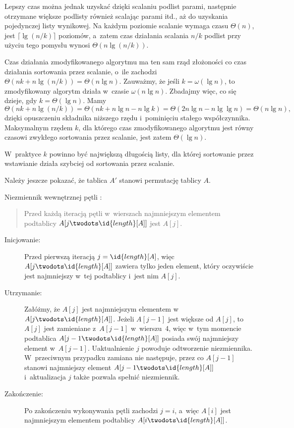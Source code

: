 Lepszy czas można jednak uzyskać dzięki scalaniu podlist parami, następnie otrzymane większe podlisty również scalając parami itd., aż do uzyskania pojedynczej listy wynikowej. Na każdym poziomie scalanie wymaga czasu $\Theta(n)$, jest $\lceil\lg(n/k)\rceil$ poziomów, a~zatem czas działania scalania $n/k$ podlist przy użyciu tego pomysłu wynosi $\Theta(n\lg(n/k))$.

\subproblem %
Czas działania zmodyfikowanego algorytmu ma ten sam rząd złożoności co czas działania sortowania przez scalanie, o~ile zachodzi $\Theta(nk+n\lg(n/k))=\Theta(n\lg n)$. Zauważmy, że jeśli $k=\omega(\lg n)$, to zmodyfikowany algorytm działa w~czasie $\omega(n\lg n)$. Zbadajmy więc, co się dzieje, gdy $k=\Theta(\lg n)$. Mamy
\[
	\Theta(nk+n\lg(n/k)) = \Theta(nk+n\lg n-n\lg k) = \Theta(2n\lg n-n\lg\lg n) = \Theta(n\lg n),
\]
dzięki opuszczeniu składnika niższego rzędu i~pominięciu stałego współczynnika. Maksymalnym rzędem $k$, dla którego czas zmodyfikowanego algorytmu jest równy czasowi zwykłego sortowania przez scalanie, jest zatem $\Theta(\lg n)$.

\subproblem %
W~praktyce $k$ powinno być największą długością listy, dla której sortowanie przez wstawianie działa szybciej od sortowania przez scalanie.


\subproblem %
Należy jeszcze pokazać, że tablica $A'$ stanowi permutację tablicy $A$.

\subproblem %
Niezmiennik wewnętrznej pętli :
\begin{quote}
Przed każdą iteracją pętli  w~wierszach  najmniejszym elementem podtablicy $A[j\twodots\id{length}[A]]$ jest $A[j]$.
\end{quote}
\begin{description}
	\item[Inicjowanie:] Przed pierwszą iteracją $j=\id{length}[A]$, więc $A[j\twodots\id{length}[A]]$ zawiera tylko jeden element, który oczywiście jest najmniejszy w~tej podtablicy i~jest nim $A[j]$.
	\item[Utrzymanie:] Załóżmy, że $A[j]$ jest najmniejszym elementem w~$A[j\twodots\id{length}[A]]$. Jeżeli $A[j-1]$ jest większe od $A[j]$, to $A[j]$ jest zamieniane z~$A[j-1]$ w~wierszu~4, więc w~tym momencie podtablica $A[j-1\twodots\id{length}[A]]$ posiada swój najmniejszy element w~$A[j-1]$. Uaktualnienie $j$ powoduje odtworzenie niezmiennika. W~przeciwnym przypadku zamiana nie następuje, przez co $A[j-1]$ stanowi najmniejszy element $A[j-1\twodots\id{length}[A]]$ i~aktualizacja $j$ także pozwala spełnić niezmiennik.
	\item[Zakończenie:] Po zakończeniu wykonywania pętli zachodzi $j=i$, a~więc $A[i]$ jest najmniejszym elementem podtablicy $A[i\twodots\id{length}[A]]$.
\end{description}

